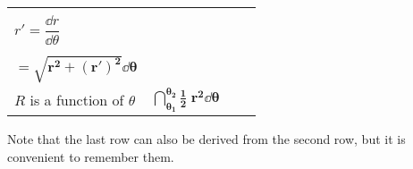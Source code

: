 \begin{center}
\begin{tcolorbox}
\begin{center}
\begin{tabular}{|p{2cm}|p{4.5cm}|p{3.5cm}|p{3.5cm}|}
\begin{minipage}{2cm}
            $r = r(\theta) $,\\
            $r' = \dfrac{\dd r}{\dd \theta} $
        \end{minipage} & \begin{minipage}{4.5cm}
            $ \sqrt{\left(\dfrac{\dd x}{\dd \theta}\right)^2 + \left(\dfrac{\dd y}{\dd \theta}\right)^2} \dd \theta $ \\
            \\
            $= \boldsymbol{\sqrt{r^2 + (r')^2} \dd \theta} $
        \end{minipage} & \begin{minipage}{3.5cm}
            $ 2\pi R \dd s $, \\
            $R$ is a function of $\theta$
        \end{minipage} & $ \boldsymbol{\dint_{\theta_1}^{\theta_2} \frac{1}{2} \; r^2 \dd \theta} $ \\
        \hline
    \end{tabular}
    \end{center}
\end{tcolorbox}
\end{center}
Note that the last row can also be derived from the second row, but it is convenient to remember them.